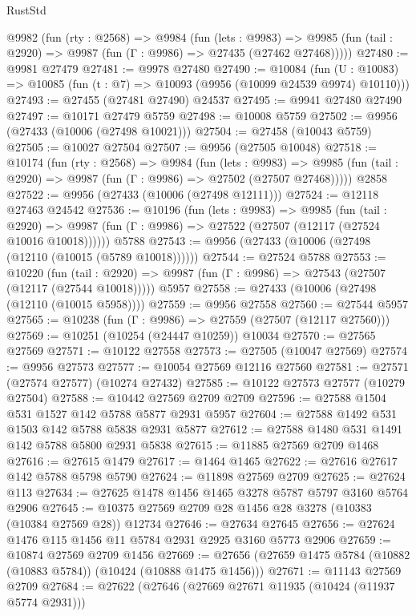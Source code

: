 \begin{lexlean}{RustStd}
\begin{coremodule}
  @9982
    (fun (rty : @2568) =>
    @9984
      (fun (lets : @9983) =>
      @9985 (fun (tail : @2920) => @9987 (fun (Γ : @9986) => @27435 (@27462 @27468)))))
@27480 := @9981 @27479
@27481 := @9978 @27480
@27490 := @10084
    (fun (U : @10083) => @10085 (fun (t : @7) => @10093 (@9956 (@10099 @24539 @9974) @10110)))
@27493 := @27455 (@27481 @27490) @24537
@27495 := @9941 @27480 @27490
@27497 := @10171 @27479 @5759
@27498 := @10008 @5759
@27502 := @9956 (@27433 (@10006 (@27498 @10021)))
@27504 := @27458 (@10043 @5759)
@27505 := @10027 @27504
@27507 := @9956 (@27505 @10048)
@27518 := @10174
    (fun (rty : @2568) =>
    @9984
      (fun (lets : @9983) =>
      @9985 (fun (tail : @2920) => @9987 (fun (Γ : @9986) => @27502 (@27507 @27468)))))
    @2858
@27522 := @9956 (@27433 (@10006 (@27498 @12111)))
@27524 := @12118 @27463 @24542
@27536 := @10196
    (fun (lets : @9983) =>
    @9985
      (fun (tail : @2920) =>
      @9987 (fun (Γ : @9986) => @27522 (@27507 (@12117 (@27524 @10016 @10018))))))
    @5788
@27543 := @9956 (@27433 (@10006 (@27498 (@12110 (@10015 (@5789 @10018))))))
@27544 := @27524 @5788
@27553 := @10220
    (fun (tail : @2920) => @9987 (fun (Γ : @9986) => @27543 (@27507 (@12117 (@27544 @10018)))))
    @5957
@27558 := @27433 (@10006 (@27498 (@12110 (@10015 @5958))))
@27559 := @9956 @27558
@27560 := @27544 @5957
@27565 := @10238 (fun (Γ : @9986) => @27559 (@27507 (@12117 @27560)))
@27569 := @10251 (@10254 (@24447 @10259)) @10034
@27570 := @27565 @27569
@27571 := @10122 @27558
@27573 := @27505 (@10047 @27569)
@27574 := @9956 @27573
@27577 := @10054 @27569 @12116 @27560
@27581 := @27571 (@27574 @27577) (@10274 @27432)
@27585 := @10122 @27573 @27577 (@10279 @27504)
@27588 := @10442 @27569 @2709 @2709
@27596 := @27588 @1504 @531 @1527 @142 @5788 @5877 @2931 @5957
@27604 := @27588 @1492 @531 @1503 @142 @5788 @5838 @2931 @5877
@27612 := @27588 @1480 @531 @1491 @142 @5788 @5800 @2931 @5838
@27615 := @11885 @27569 @2709 @1468
@27616 := @27615 @1479
@27617 := @1464 @1465
@27622 := @27616 @27617 @142 @5788 @5798 @5790
@27624 := @11898 @27569 @2709
@27625 := @27624 @113
@27634 := @27625 @1478 @1456 @1465 @3278 @5787 @5797 @3160 @5764 @2906
@27645 := @10375 @27569 @2709 @28 @1456 @28 @3278 (@10383 (@10384 @27569 @28)) @12734
@27646 := @27634 @27645
@27656 := @27624 @1476 @115 @1456 @11 @5784 @2931 @2925 @3160 @5773 @2906
@27659 := @10874 @27569 @2709 @1456
@27669 := @27656 (@27659 @1475 @5784 (@10882 (@10883 @5784)) (@10424 (@10888 @1475 @1456)))
@27671 := @11143 @27569 @2709
@27684 := @27622
    (@27646
      (@27669 @27671 @11935 (@10424 (@11937 @5774 @2931)))

\end{coremodule}
\end{lexlean}
